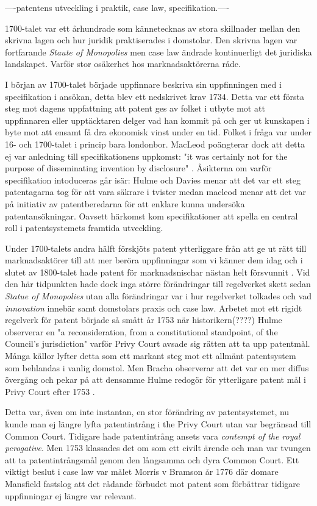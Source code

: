 ----patentens utveckling i praktik, case law, specifikation.----

1700-talet var ett århundrade som kännetecknas av stora skillnader mellan den skrivna lagen och hur juridik praktiserades i domstolar. Den skrivna lagen var fortfarande \emph{Staute of Monopolies} men case law ändrade kontinuerligt det juridiska landskapet. Varför stor osäkerhet hos marknadsaktörerna råde.

I början av 1700-talet började uppfinnare beskriva sin uppfinningen med i specifikation i ansökan, detta blev ett nedskrivet krav 1734\cite{macleod}. 
Detta var ett första steg mot dagens uppfattning att patent ges av folket i utbyte mot att uppfinnaren eller
upptäcktaren delger vad han kommit på och ger ut kunskapen i byte mot att ensamt få dra ekonomisk vinst
under en tid. Folket i fråga var under 16- och 1700-talet i princip bara londonbor. MacLeod poängterar dock att detta ej var anledning till specifikationens uppkomst: "it was certainly not for the purpose of disseminating invention by disclosure" \cite{macleod2}. Åsikterna om varför specifikation intoduceras går isär: Hulme och Davies menar att det var ett steg patentagarna tog för att vara säkrare i tvister medan macleod menar att det var på initiativ av patentberedarna för att enklare kunna undersöka patentansökningar. Oavsett härkomst kom specifikationer att spella en central roll i patentsystemets framtida utveckling.

Under 1700-talets andra hälft förskjöts patent ytterliggare från att ge ut rätt till marknadsaktörer till att mer beröra uppfinningar som vi känner dem idag och i slutet av 1800-talet hade patent för marknadsnischar nästan helt försvunnit \cite{bracha}. 
Vid den här tidpunkten hade dock inga större förändringar till regelverket skett sedan \emph{Statue of Monopolies}
utan alla förändringar var i hur regelverket tolkades och vad \emph{innovation} innebär samt domstolars praxis och case law. Arbetet mot ett rigidt regelverk för patent började så smått år 1753 när historikern(????) Hulme \cite{hulme} observerar en "a reconsideration, from a constitutional standpoint, of the Council’s jurisdiction" varför Privy Court avsade sig rätten att ta upp patentmål. Många källor lyfter detta som ett markant steg mot ett allmänt patentsystem som behlandas i vanlig domstol. Men Bracha observerar att det var en mer diffus övergång och pekar på att densamme Hulme redogör för ytterligare patent mål i Privy Court efter 1753 \cite{bracha}.

Detta var, även om inte instantan, en stor förändring av patentsystemet, nu kunde man ej längre lyfta patentintrång i the Privy Court utan var begränsad till Common Court. Tidigare hade patentintrång ansets vara \emph{contempt of the royal perogative}. Men 1753 klassades det om som ett civilt ärende och man var tvungen att ta patentintrångsmål genom den långsamma och dyra Common Court. Ett viktigt beslut i case law var målet Morris v Bramson år 1776 där domare Mansfield fastslog att det rådande förbudet mot patent som förbättrar tidigare uppfinningar ej längre var relevant\cite{bracha}.

